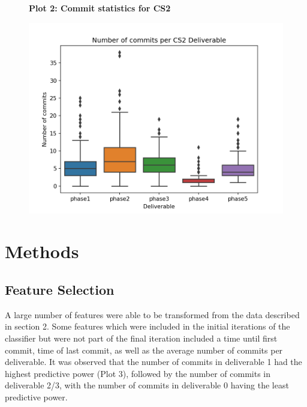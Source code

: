 \documentclass[sigchi]{acmart}
\begin{document}
\begin{figure}
    \centering
    \textbf{Plot 2: Commit statistics for CS2}\par\medskip
  \includegraphics[width=\linewidth]{cs2-commit-boxplot.png}
\end{figure}


\section{Methods}

\subsection{Feature Selection}

A large number of features were able to be transformed from the data described in section 2. Some features which were included in the initial iterations of the classifier but were not part of the final iteration included a time until first commit, time of last commit, as well as the average number of commits per deliverable. It was observed that the number of commits in deliverable 1 had the highest predictive power (Plot 3), followed by the number of commits in deliverable 2/3, with the number of commits in deliverable 0 having the least predictive power.
\end{document}
